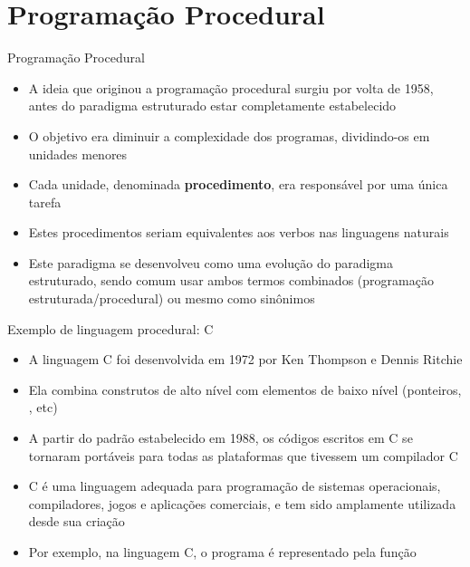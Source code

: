 \section{Programação Procedural}

\begin{frame}[fragile]{Programação Procedural}

    \begin{itemize}
        \item A ideia que originou a programação procedural surgiu por volta de 1958, antes do 
            paradigma estruturado estar completamente estabelecido

        \item O objetivo era diminuir a complexidade dos programas, dividindo-os em unidades
            menores

        \item Cada unidade, denominada \textbf{procedimento}, era responsável por uma única tarefa

        \item Estes procedimentos seriam equivalentes aos verbos nas linguagens naturais

        \item Este paradigma se desenvolveu como uma evolução do paradigma estruturado, sendo 
            comum usar ambos termos combinados (programação estruturada/procedural) ou mesmo
            como sinônimos

    \end{itemize}

\end{frame}

\begin{frame}[fragile]{Exemplo de linguagem procedural: C}

    \begin{itemize}
        \item A linguagem C foi desenvolvida em 1972 por Ken Thompson e Dennis Ritchie

        \item Ela combina construtos de alto nível com elementos de baixo nível (ponteiros,
            , etc)

        \item A partir do padrão estabelecido em 1988, os códigos escritos em C se tornaram
            portáveis para todas as plataformas que tivessem um compilador C

        \item C é uma linguagem adequada para programação de sistemas operacionais, compiladores,
            jogos e aplicações comerciais, e tem sido amplamente utilizada desde sua criação

        \item Por exemplo, na linguagem C, o programa é representado pela função 

    \end{itemize}

\end{frame}

